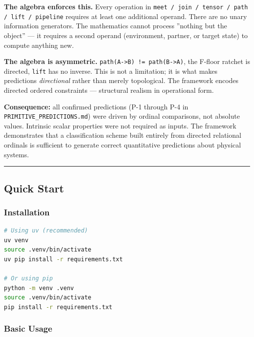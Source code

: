 \documentclass[12pt,a4paper]{article}
\begin{document}
\textbf{The algebra enforces this.} Every operation in \texttt{meet / join / tensor / path / lift / pipeline} requires at least one additional operand. There are no unary information generators. The mathematics cannot process ''nothing but the object'' --- it requires a second operand (environment, partner, or target state) to compute anything new.

\textbf{The algebra is asymmetric.} \texttt{path(A-\textgreater{}B) != path(B-\textgreater{}A)}, the F-floor ratchet is directed, \texttt{lift} has no inverse. This is not a limitation; it is what makes predictions \emph{directional} rather than merely topological. The framework encodes directed ordered constraints --- structural realism in operational form.

\textbf{Consequence:} all confirmed predictions (P-1 through P-4 in \texttt{PRIMITIVE\_PREDICTIONS.md}) were driven by ordinal comparisons, not absolute values. Intrinsic scalar properties were not required as inputs. The framework demonstrates that a classification scheme built entirely from directed relational ordinals is sufficient to generate correct quantitative predictions about physical systems.

\begin{center}
\rule{0.5\textwidth}{0.4pt}
\end{center}

\subsection{Quick Start}

\subsubsection{Installation}

\begin{lstlisting}[language=bash]
# Using uv (recommended)
uv venv
source .venv/bin/activate
uv pip install -r requirements.txt

# Or using pip
python -m venv .venv
source .venv/bin/activate
pip install -r requirements.txt
\end{lstlisting}

\subsubsection{Basic Usage}
\end{document}
